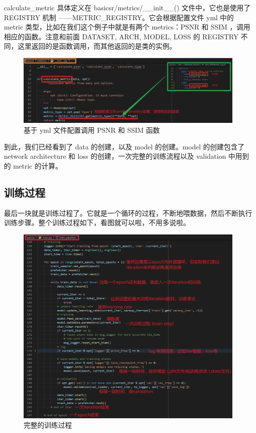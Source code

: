 \documentclass[../main.tex]{subfiles}
\begin{document}
\begin{enumerate}
\begin{enumerate}
calculate\_metric 具体定义在 basicsr/metrics/\_\_init\_\_() 文件中，它也是使用了 REGISTRY 机制 ——METRIC\_REGISTRY。它会根据配置文件 yml 中的 metric 类型，比如在我们这个例子中就是有两个 metrics：PSNR 和 SSIM ，调用相应的函数。注意和前面 DATASET, ARCH, MODEL, LOSS 的 REGISTRY 不同，这里返回的是函数调用，而其他返回的是类的实例。
\begin{figure}[H]
\begin{center}
    \includegraphics[width=0.7\linewidth]{figures/getting_start_20.png}
    \caption{基于 yml 文件配置调用 PSNR 和 SSIM 函数}
    \label{fig:getting_start_19}
\end{center}
\vspace{-0.5cm}
\end{figure}

到此，我们已经看到了 data 的创建，以及 model 的创建。model 的创建包含了 network architecture 和 loss 的创建，一次完整的训练流程以及 validation 中用到的 metric 的计算。

\end{enumerate}

\subsection{训练过程}

最后一块就是训练过程了。它就是一个循环的过程，不断地喂数据，然后不断执行训练步骤。整个训练过程如下，看图就可以啦，不用多说啦。

\begin{figure}[H]
\begin{center}
    \includegraphics[width=0.7\linewidth]{figures/getting_start_21.png}
    \caption{完整的训练过程}
    \label{fig:getting_start_19}
\end{center}
\vspace{-0.5cm}
\end{figure}


\end{enumerate}
\end{document}
